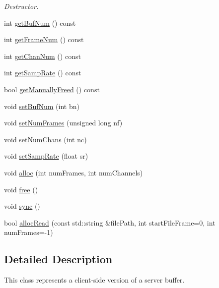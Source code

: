 \begin{DoxyCompactItemize}
\begin{DoxyCompactList}\small\item\em Destructor. \end{DoxyCompactList}\item 
int \hyperlink{classsc_1_1Buffer_af777b92a6ba7b4330fb9958141282cc9}{get\-Buf\-Num} () const 
\item 
int \hyperlink{classsc_1_1Buffer_a591c50bcaae889d763ff28688febeb71}{get\-Frame\-Num} () const 
\item 
int \hyperlink{classsc_1_1Buffer_a57f2455044a2303a1fba1d17e2a7470c}{get\-Chan\-Num} () const 
\item 
int \hyperlink{classsc_1_1Buffer_a15c75bed82addc4ec16b74e98e5ee770}{get\-Samp\-Rate} () const 
\item 
bool \hyperlink{classsc_1_1Buffer_aa3002f528e1eda702d29626004069491}{get\-Manually\-Freed} () const 
\item 
void \hyperlink{classsc_1_1Buffer_a444402b37e84ca30c529df66749c897d}{set\-Buf\-Num} (int bn)
\item 
void \hyperlink{classsc_1_1Buffer_a4ed9a45c0ac7c1b4d7cda850153bfb4a}{set\-Num\-Frames} (unsigned long nf)
\item 
void \hyperlink{classsc_1_1Buffer_afd3831ddbad9748d31dd6260ba6392fc}{set\-Num\-Chans} (int nc)
\item 
void \hyperlink{classsc_1_1Buffer_a9ba693d9d86afaccce4d76788dcaff80}{set\-Samp\-Rate} (float sr)
\item 
void \hyperlink{classsc_1_1Buffer_aea7cfaacdfee70a766d18f0a167f7612}{alloc} (int num\-Frames, int num\-Channels)
\item 
void \hyperlink{classsc_1_1Buffer_a94deb84c1e5375bb1922092fe9f1f5e6}{free} ()
\item 
void \hyperlink{classsc_1_1Buffer_a1577c3e412d9e528ddd17d1e95c95369}{sync} ()
\item 
bool \hyperlink{classsc_1_1Buffer_a1ff413c036076debd2810dde7c127874}{alloc\-Read} (const std\-::string \&file\-Path, int start\-File\-Frame=0, int num\-Frames=-\/1)
\end{DoxyCompactItemize}


\subsection{Detailed Description}
This class represents a client-\/side version of a server buffer. 

